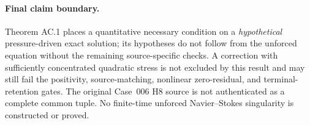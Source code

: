 \paragraph{Final claim boundary.}
Theorem AC.1 places a quantitative necessary condition on a
\emph{hypothetical} pressure-driven exact solution; its hypotheses
do not follow from the unforced equation without the remaining
source-specific checks. A correction with sufficiently concentrated
quadratic stress is not excluded by this result and may still fail
the positivity, source-matching, nonlinear zero-residual, and
terminal-retention gates. The original Case~006 H8 source is not
authenticated as a complete common tuple. No finite-time unforced
Navier--Stokes singularity is constructed or proved.
